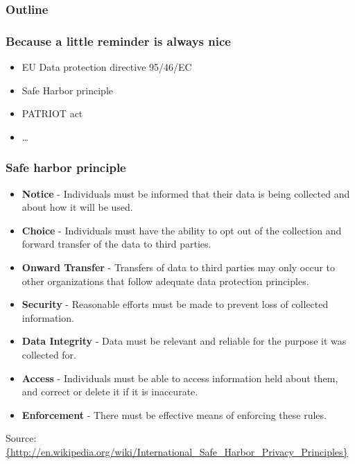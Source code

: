 \documentclass{beamer}
\begin{document}
\begin{frame}
  \frametitle{Outline}
\end{frame}

\begin{frame}
    \frametitle{Because a little reminder is always nice}
    \begin{itemize}
        \item EU Data protection directive 95/46/EC
        \item Safe Harbor principle
        \item PATRIOT act
        \item \dots
    \end{itemize}
\end{frame}

\begin{frame}
    \frametitle{Safe harbor principle}
    \begin{scriptsize}
    \begin{itemize}
        \item \textbf{Notice} - Individuals must be informed that their data is being collected and about how it will be used.
        \item \textbf{Choice} - Individuals must have the ability to opt out of the collection and forward transfer of the data to third parties.
        \item \textbf{Onward Transfer} - Transfers of data to third parties may only occur to other organizations that follow adequate data protection principles.
        \item \textbf{Security} - Reasonable efforts must be made to prevent loss of collected information.
        \item \textbf{Data Integrity} - Data must be relevant and reliable for the purpose it was collected for.
        \item \textbf{Access} - Individuals must be able to access information held about them, and correct or delete it if it is inaccurate.
        \item \textbf{Enforcement} - There must be effective means of enforcing these rules.
    \end{itemize}
    \end{scriptsize}
    \footnotesize{Source: \url{{http://en.wikipedia.org/wiki/International_Safe_Harbor_Privacy_Principles}}}
\end{frame}
\end{document}
